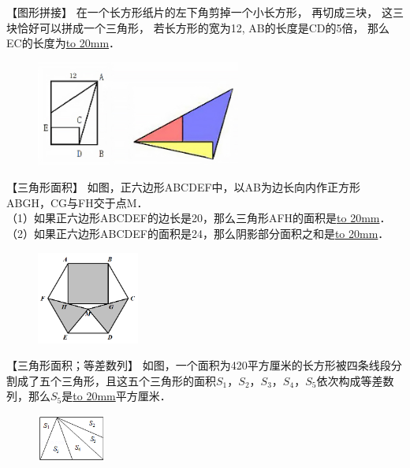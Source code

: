 \item {
    【图形拼接】
    {在一个长方形纸片的左下角剪掉一个小长方形，
    再切成三块， 这三块恰好可以拼成一个三角形，
    若长方形的宽为12, AB的长度是CD的5倍，
    那么EC的长度为\underline{\hbox to 20mm{}}．} 
    \begin{figure}[H] 
        \centering
        \includegraphics[width=0.6\textwidth]{./pics/Chapter_3/6.png}
    \end{figure}
    \vspace{1cm}
}

\item {
    【三角形面积】
    如图，正六边形ABCDEF中，以AB为边长向内作正方形ABGH，CG与FH交于点M．\\
    （1）如果正六边形ABCDEF的边长是20，那么三角形AFH的面积是\underline{\hbox to 20mm{}}．\\
    （2）如果正六边形ABCDEF的面积是24，那么阴影部分面积之和是\underline{\hbox to 20mm{}}．
    \begin{figure}[H] 
        \centering
        \includegraphics[width=0.3\textwidth]{./pics/Chapter_3/3.png}
    \end{figure}
    \vspace{1cm}
}

\item {
    【三角形面积；等差数列】
    如图，一个面积为420平方厘米的长方形被四条线段分割成了五个三角形，且这五个三角形的面积$S_1，S_2，S_3，S_4，S_5$依次构成等差数列，那么$S_5$是\underline{\hbox to 20mm{}}平方厘米．
    \begin{figure}[H] 
        \centering
        \includegraphics[width=0.2\textwidth]{./pics/Chapter_3/16.png}
    \end{figure}
    \vspace{1cm}
}

